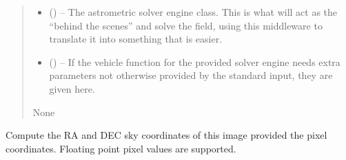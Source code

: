 \documentclass[letterpaper,11pt,english]{sphinxmanual}
\begin{document}
\begin{savenotes}
\begin{fulllineitems}
\begin{savenotes}
\begin{fulllineitems}
\begin{quote}
\begin{description}
\begin{itemize}
\item {} 
\sphinxAtStartPar
{} ({\hyperref[\detokenize{code/opihiexarata.library.engine:opihiexarata.library.engine.AstrometryEngine}]{}}) – The astrometric solver engine class. This is what will act as the
“behind the scenes” and solve the field, using this middleware to
translate it into something that is easier.

\item {} 
\sphinxAtStartPar
{} () – If the vehicle function for the provided solver engine needs
extra parameters not otherwise provided by the standard input,
they are given here.

\end{itemize}

\sphinxAtStartPar
None

\end{description}\end{quote}

\end{fulllineitems}\end{savenotes}


\begin{savenotes}\begin{fulllineitems}
\label{\detokenize{code/opihiexarata.astrometry.solution:opihiexarata.astrometry.solution.AstrometricSolution.pixel_to_sky_coordinates}}
\pysigstartsignatures
{}
\pysigstopsignatures
\sphinxAtStartPar
Compute the RA and DEC sky coordinates of this image provided
the pixel coordinates. Floating point pixel values are supported.


\end{fulllineitems}
\end{savenotes}
\end{fulllineitems}
\end{savenotes}
\end{document}
